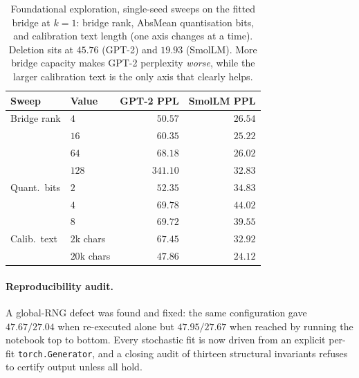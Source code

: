 \documentclass[10pt,a4paper]{article}
\begin{document}
\begin{table}[t]
\centering
\small
\begin{tabular}{llrr}
\toprule
Sweep & Value & GPT-2 PPL & SmolLM PPL \\
\midrule
Bridge rank & $4 $ & $50.57$ & $26.54$ \\
            & $16$ & $60.35$ & $25.22$ \\
            & $64$ & $68.18$ & $26.02$ \\
            & $128$ & $341.10$ & $32.83$ \\
\midrule
Quant.\ bits & $2$ & $52.35$ & $34.83$ \\
            & $4$ & $69.78$ & $44.02$ \\
            & $8$ & $69.72$ & $39.55$ \\
\midrule
Calib.\ text & $2$k chars & $67.45$ & $32.92$ \\
            & $20$k chars & $47.86$ & $24.12$ \\
\bottomrule
\end{tabular}
\caption{Foundational exploration, single-seed sweeps on the fitted bridge at
$k{=}1$: bridge rank, AbsMean quantisation bits, and calibration text length
(one axis changes at a time). Deletion sits at $45.76$ (GPT-2) and $19.93$
(SmolLM). More bridge capacity makes GPT-2 perplexity \emph{worse}, while the
larger calibration text is the only axis that clearly helps.}
\label{tab:foundation-abl}
\end{table}

\paragraph{Reproducibility audit.} A global-RNG defect was found and fixed: the
same configuration gave $47.67/27.04$ when re-executed alone but $47.95/27.67$
when reached by running the notebook top to bottom. Every stochastic fit is now
driven from an explicit per-fit \texttt{torch.Generator}, and a closing audit of
thirteen structural invariants refuses to certify output unless all hold.
\end{document}
